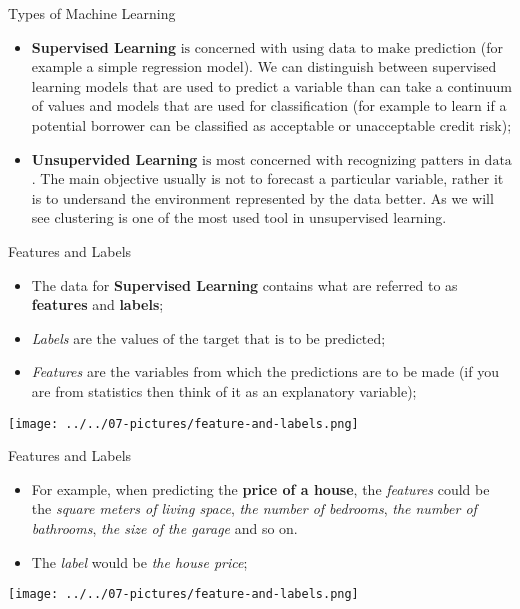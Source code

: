 \documentclass[11pt]{beamer}
\newcommand{\highlight}[1]{%
  \colorbox{yellow!100}{$\displaystyle#1$}}
\begin{document}
\begin{frame}{Types of Machine Learning }
	\begin{itemize}
		\item \textbf{Supervised Learning} \highlight{\text{is concerned with using data to make prediction}} (for example a simple regression model). We can distinguish between supervised learning models that are used to predict a variable than can take a continuum of values and models that are used for classification (for example to learn if a potential borrower can be classified as acceptable or unacceptable credit risk);
		\item \textbf{Unsupervided Learning} \highlight{\text{is most concerned with recognizing patters in data}}. The main objective usually is not to forecast a particular variable, rather it is to undersand the environment represented by the data better. As we will see clustering is one of the most used tool in unsupervised learning. 
	\end{itemize}
\end{frame}
\begin{frame}{Features and Labels}
	\begin{itemize}
		\item The data for \textbf{Supervised Learning} contains what are referred to as \textbf{features} and \textbf{labels};
		\item \textit{Labels} are \highlight{\text{the values of the target that is to be predicted}};
		\item \textit{Features} are \highlight{\text{the variables from which the predictions are to be made}} (if you are from statistics then think of it as an explanatory variable);
	\end{itemize}
\begin{center}
\texttt{[image: ../../07-pictures/feature-and-labels.png]} 
\end{center}	
	
\end{frame}
\begin{frame}{Features and Labels}
	\begin{itemize}
		\item For example, when predicting the \textbf{price of a house}, the \textit{features} could be the \textit{square meters of living space}, \textit{the number of bedrooms}, \textit{the number of bathrooms}, \textit{the size of the garage} and so on. 
		\item The \textit{label} would be \textit{the house price};  
	\end{itemize}
\begin{center}
\texttt{[image: ../../07-pictures/feature-and-labels.png]} 
\end{center}	
\end{frame}
\end{document}
